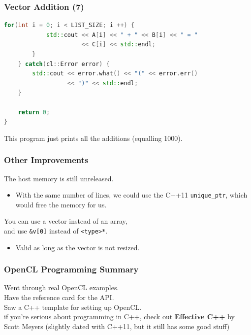 \begin{frame}[fragile]
  \frametitle{Vector Addition (7)}


  \begin{lstlisting}[language=C++]
        for(int i = 0; i < LIST_SIZE; i ++) {
            std::cout << A[i] << " + " << B[i] << " = "
                      << C[i] << std::endl;
        }
    } catch(cl::Error error) {
        std::cout << error.what() << "(" << error.err()
                  << ")" << std::endl;
    }
 
    return 0;
}
  \end{lstlisting}

    This program just prints all the additions (equalling 1000).


\end{frame}

\begin{frame}
  \frametitle{Other Improvements}


    The host memory is still unreleased.
      \begin{itemize}
        \item With the same number of lines, we could use the C++11
          {\tt unique\_ptr}, which would free the memory for us.
      \end{itemize}
    You can use a vector instead of an array, \\ and use {\tt \&v[0]} instead
      of {\tt <type>*}.
      \begin{itemize}
        \item Valid as long as the vector is not resized.
      \end{itemize}

\end{frame}

\begin{frame}
  \frametitle{OpenCL Programming Summary}


    Went through real OpenCL examples.\\

    Have the reference card for the API.\\[1em]

    Saw a C++ template for setting up OpenCL.\\[1em]

     if you're serious about programming in C++, check
      out {\bf Effective C++} by Scott Meyers (slightly dated with C++11, but
      it still has some good stuff)

\end{frame}


